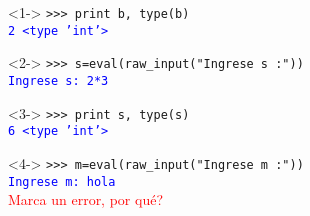 \documentclass[12pt]{beamer}
\begin{document}
\begin{frame}[fragile]
\begin{minipage}{9cm}
\begin{exampleblock}{}<1->
	\verb|>>> print b, type(b)| \\
	\pause
	\textcolor{blue}{\texttt{2 <type 'int'>}}
\end{exampleblock}
\begin{exampleblock}{}<2->
	\verb|>>> s=eval(raw_input("Ingrese s :"))| \\
	\pause
	\textcolor{blue}{\texttt{Ingrese s: 2*3}}
\end{exampleblock}
\begin{exampleblock}{}<3->
	\verb|>>> print s, type(s)| \\
	\pause
	\textcolor{blue}{\texttt{6 <type 'int'>}}
\end{exampleblock}
\begin{exampleblock}{}<4->
	\verb|>>> m=eval(raw_input("Ingrese m :"))| \\
	\pause
	\textcolor{blue}{\texttt{Ingrese m: hola}} \\
	\pause
	\textcolor{red}{Marca un error, por qué?}
\end{exampleblock}
\end{minipage}
\end{frame}
\end{document}
